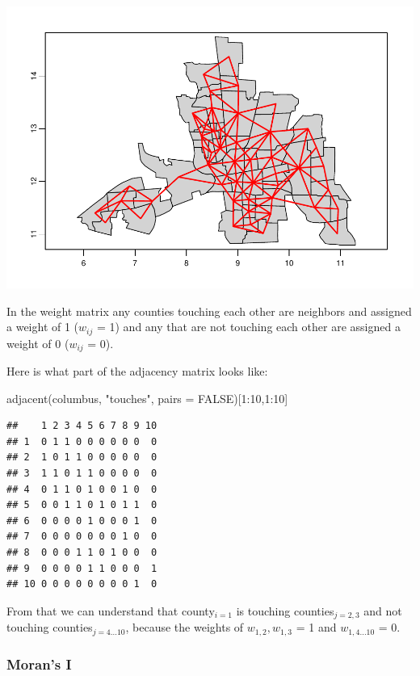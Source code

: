 \documentclass[
]{article}
\newenvironment{Shaded}{\begin{snugshade}}{\end{snugshade}}
\newcommand{\AttributeTok}[1]{\textcolor[rgb]{0.77,0.63,0.00}{#1}}
\newcommand{\ConstantTok}[1]{\textcolor[rgb]{0.00,0.00,0.00}{#1}}
\newcommand{\DecValTok}[1]{\textcolor[rgb]{0.00,0.00,0.81}{#1}}
\newcommand{\FunctionTok}[1]{\textcolor[rgb]{0.00,0.00,0.00}{#1}}
\newcommand{\NormalTok}[1]{#1}
\newcommand{\SpecialCharTok}[1]{\textcolor[rgb]{0.00,0.00,0.00}{#1}}
\newcommand{\StringTok}[1]{\textcolor[rgb]{0.31,0.60,0.02}{#1}}
\begin{document}
\includegraphics{midterm-project_files/figure-latex/unnamed-chunk-5-1.pdf}

In the weight matrix any counties touching each other are neighbors and
assigned a weight of 1 (\(w_{ij}\) = 1) and any that are not touching
each other are assigned a weight of 0 (\(w_{ij}\) = 0).

Here is what part of the adjacency matrix looks like:

\begin{Shaded}
\begin{Highlighting}[]
\FunctionTok{adjacent}\NormalTok{(columbus, }\StringTok{"touches"}\NormalTok{, }\AttributeTok{pairs =} \ConstantTok{FALSE}\NormalTok{)[}\DecValTok{1}\SpecialCharTok{:}\DecValTok{10}\NormalTok{,}\DecValTok{1}\SpecialCharTok{:}\DecValTok{10}\NormalTok{]}
\end{Highlighting}
\end{Shaded}

\begin{verbatim}
##    1 2 3 4 5 6 7 8 9 10
## 1  0 1 1 0 0 0 0 0 0  0
## 2  1 0 1 1 0 0 0 0 0  0
## 3  1 1 0 1 1 0 0 0 0  0
## 4  0 1 1 0 1 0 0 1 0  0
## 5  0 0 1 1 0 1 0 1 1  0
## 6  0 0 0 0 1 0 0 0 1  0
## 7  0 0 0 0 0 0 0 1 0  0
## 8  0 0 0 1 1 0 1 0 0  0
## 9  0 0 0 0 1 1 0 0 0  1
## 10 0 0 0 0 0 0 0 0 1  0
\end{verbatim}

From that we can understand that county\(_{i=1}\) is touching
counties\(_{j = 2, 3}\) and not touching counties\(_{j=4\dots10}\),
because the weights of \(w_{1,2}, w_{1,3}\) = 1 and \(w_{1,4\dots10}\) =
0.

\hypertarget{morans-i}{%
\subsubsection{Moran's I}\label{morans-i}}
\end{document}
